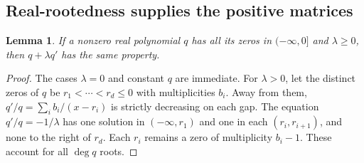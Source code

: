 \documentclass[11pt,a4paper]{article}
\numberwithin{equation}{section}
\newtheorem{lemma}[theorem]{Lemma}
\theoremstyle{definition}
\theoremstyle{remark}
\begin{document}
\subsection{Real-rootedness supplies the positive matrices}

\begin{lemma}\label{can-jen-differential-preserver}
If a nonzero real polynomial $q$ has all its zeros in $(-\infty,0]$
and $\lambda\geq0$, then $q+\lambda q'$ has the same property.
\end{lemma}
\begin{proof}
The cases $\lambda=0$ and constant $q$ are immediate. For $\lambda>0$,
let the distinct zeros of $q$ be $r_1<\cdots<r_d\leq0$ with
multiplicities $b_i$. Away from them,
$q'/q=\sum_i b_i/(x-r_i)$ is strictly decreasing on each gap.
The equation $q'/q=-1/\lambda$ has one solution in
$(-\infty,r_1)$ and one in each $(r_i,r_{i+1})$, and none to
the right of $r_d$. Each $r_i$ remains a zero of multiplicity
$b_i-1$. These account for all $\deg q$ roots.
\end{proof}
\end{document}
